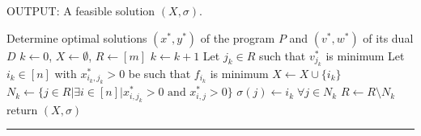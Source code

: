 \documentclass[a4paper, 12pt]{article}
\begin{document}
	OUTPUT: A feasible solution $(X, \sigma)$.
	\begin{algorithmic}[1]
		\State Determine optimal solutions $(x^*, y^*)$ of the program $P$ and $(v^*, w^*)$ of its dual $D$
		\State $k \gets 0$, $X \gets \emptyset$, $R \gets [m]$
		\State $k \gets k+1$
		\State Let $j_k \in R$ such that $v_{j_k}^*$ is minimum
		\State Let $i_k \in [n]$ with $x_{i_k,j_k}^* > 0$ be such that $f_{i_k}$ is minimum
		\State $X \gets X \cup \{i_k\}$
		\State $N_k \gets \{j \in R | \exists i \in [n] | x_{i,j_k}^* > 0 \text{ and } x_{i,j}^* > 0\}$
		\State $\sigma(j) \gets i_k \; \forall j \in N_k$
		\State $R \gets R \setminus N_k$
		\EndWhile
		\State return $(X, \sigma)$
	\end{algorithmic}
	\par\noindent\rule{\textwidth}{0.4pt}\\
\end{document}

